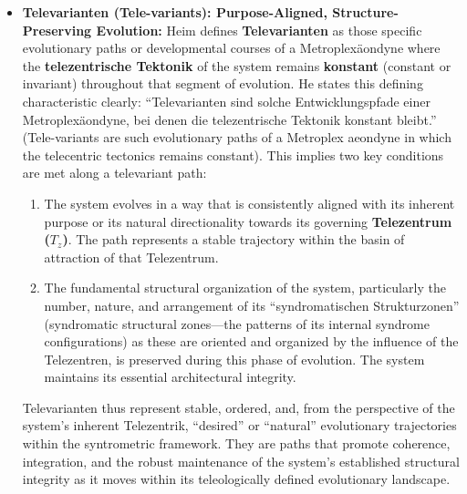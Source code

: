 \documentclass[12pt]{article}
\newcommand{\q}[1]{\enquote{#1}}
\newcommand{\telezentrum}{T_z}
\begin{document}
\begin{itemize}
    \item \textbf{Televarianten (Tele-variants): Purpose-Aligned, Structure-Preserving Evolution:}
    Heim defines \textbf{Televarianten} as those specific evolutionary paths or developmental courses of a Metroplexäondyne where the \textbf{telezentrische Tektonik} of the system remains \textbf{konstant} (constant or invariant) throughout that segment of evolution. He states this defining characteristic clearly: \q{Televarianten sind solche Entwicklungspfade einer Metroplexäondyne, bei denen die telezentrische Tektonik konstant bleibt.} (Tele-variants are such evolutionary paths of a Metroplex aeondyne in which the telecentric tectonics remains constant).
    This implies two key conditions are met along a televariant path:
    \begin{enumerate}
        \item The system evolves in a way that is consistently aligned with its inherent purpose or its natural directionality towards its governing \textbf{Telezentrum (\( \telezentrum \))}. The path represents a stable trajectory within the basin of attraction of that Telezentrum.
        \item The fundamental structural organization of the system, particularly the number, nature, and arrangement of its \q{syndromatischen Strukturzonen} (syndromatic structural zones—the patterns of its internal syndrome configurations) as these are oriented and organized by the influence of the Telezentren, is preserved during this phase of evolution. The system maintains its essential architectural integrity.
    \end{enumerate}
    Televarianten thus represent stable, ordered, and, from the perspective of the system's inherent Telezentrik, \q{desired} or \q{natural} evolutionary trajectories within the syntrometric framework. They are paths that promote coherence, integration, and the robust maintenance of the system's established structural integrity as it moves within its teleologically defined evolutionary landscape.


\end{itemize}
\end{document}
